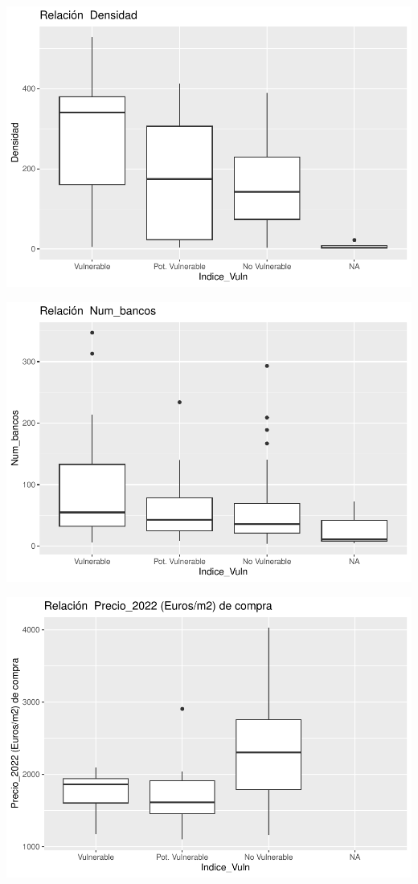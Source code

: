 \documentclass[notspecified,article,submit,moreauthors,pdftex]{Definitions/mdpi}
\begin{document}
\begin{center}\includegraphics{./figure/unnamed-chunk-23-11} \end{center}

\begin{center}\includegraphics{./figure/unnamed-chunk-23-12} \end{center}

\begin{center}\includegraphics{./figure/unnamed-chunk-23-13} \end{center}
\end{document}
